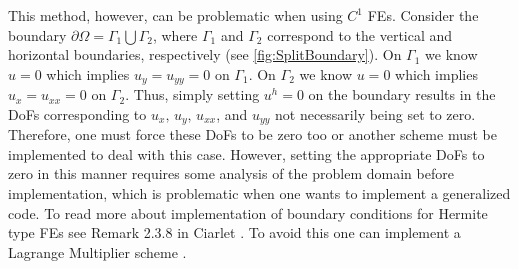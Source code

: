 

This method, however, can be problematic when using $C^1$ FEs. Consider the
boundary $\partial \Omega = \Gamma_1 \bigcup \Gamma_2$, where $\Gamma_1$ and
$\Gamma_2$ correspond to the vertical and horizontal boundaries, respectively
(see \autoref{fig:SplitBoundary}).  On $\Gamma_1$ we know $u=0$ which implies
$u_y = u_{yy} = 0$ on $\Gamma_1$.  On $\Gamma_2$ we know $u=0$ which implies
$u_x = u_{xx} = 0$ on $\Gamma_2$. Thus, simply setting $u^h = 0$ on the boundary
results in the DoFs corresponding to $u_x,\,u_y,\,u_{xx}$, and $u_{yy}$ not
necessarily being set to zero. Therefore, one must force these DoFs to be zero
too or another scheme must be implemented to deal with this case. However,
setting the appropriate DoFs to zero in this manner requires some analysis of
the problem domain before implementation, which is problematic when one wants to
implement a generalized code. To read more about implementation of boundary
conditions for Hermite type FEs see Remark 2.3.8 in Ciarlet \cite{Ciarlet}. To
avoid this one can implement a Lagrange Multiplier scheme
\cite{Babuska1973,Barbosa1991,Barbosa1992,Bramble1981,Pitkaranta1980,Pitkaranta1981}.



